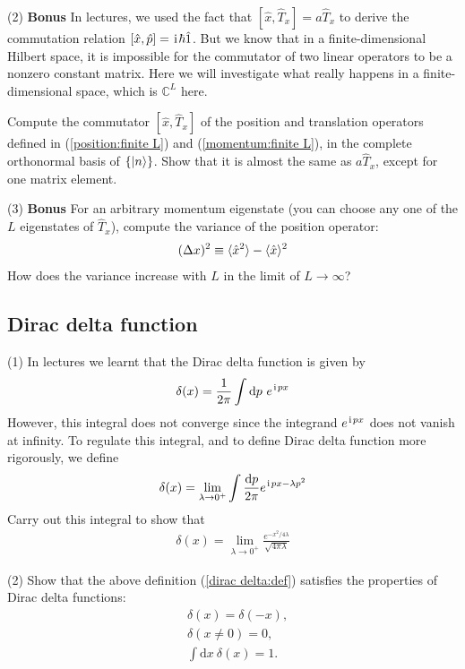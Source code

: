 (2) \textbf{Bonus} In lectures, we used the fact that $[\hat x,\hat T_x]=a\hat T_x$ to derive the commutation relation $[\hat x,\hat p]=\hspace{1pt}\mathrm{i}\hspace{1pt}\hbar\hat1$. But we know that in a finite-dimensional Hilbert space, it is impossible for the commutator of two linear operators to be a nonzero constant matrix. Here we will investigate what really happens in a finite-dimensional space, which is $\mathbb{C}^L$ here. 

Compute the commutator $[\hat x,\hat T_x]$ of the position and translation operators defined in (\ref{position:finite L}) and (\ref{momentum:finite L}), in the complete orthonormal basis of $\{|{n}\rangle\}$. Show that it is almost the same as $a\hat T_x$, except for one matrix element. 


(3) \textbf{Bonus} For an arbitrary momentum eigenstate (you can choose any one of the $L$ eigenstates of $\hat T_x$), compute the variance of the position operator:
\begin{align}
(\Delta x)^2\equiv\langle{\hat x^2}\rangle-\langle{\hat x}\rangle^2
\end{align}
How does the variance increase with $L$ in the limit of $L\rightarrow\infty$?

\subsection{Dirac delta function}

(1) In lectures we learnt that the Dirac delta function is given by
\begin{align}
\delta(x)=\frac1{{2\pi}}\int\text{d}p~e^{\hspace{1pt}\mathrm{i}\hspace{1pt} px}
\end{align}
However, this integral does not converge since the integrand $e^{\hspace{1pt}\mathrm{i}\hspace{1pt} px}$ does not vanish at infinity. To regulate this integral, and to define Dirac delta function more rigorously, we define
\begin{align}
\delta(x)=\lim_{\lambda\rightarrow0^+}\int\frac{\text{d}p}{{2\pi}}e^{\hspace{1pt}\mathrm{i}\hspace{1pt} px-\lambda p^2}
\end{align}
Carry out this integral to show that
\begin{align}\label{dirac delta:def}
\delta(x)=\lim_{\lambda\rightarrow0^+}\frac{e^{-x^2/4\lambda}}{\sqrt{4\pi\lambda}}
\end{align}

(2) Show that the above definition (\ref{dirac delta:def}) satisfies the properties of Dirac delta functions:
\begin{align}\label{dirac delta:parity}
&\delta(x)=\delta(-x),\\
&\delta(x\neq0)=0,\\
&\int\text{d}x~\delta(x)=1.\label{dirac delta:integral}
\end{align}

